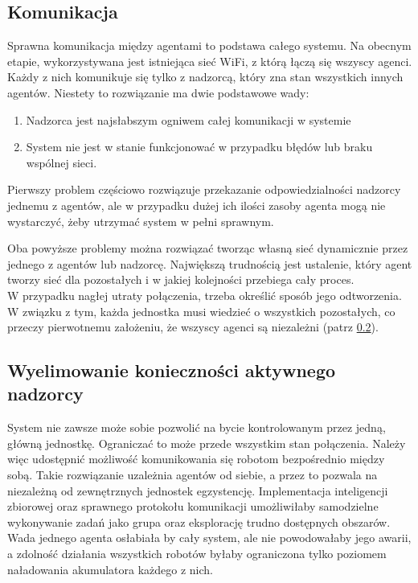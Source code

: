 \subsection{Komunikacja}

Sprawna komunikacja między agentami to podstawa całego systemu. Na obecnym etapie, wykorzystywana jest istniejąca sieć WiFi, z którą łączą się wszyscy agenci. Każdy z nich komunikuje się tylko z nadzorcą, który zna stan wszystkich innych agentów. Niestety to rozwiązanie ma dwie podstawowe wady:

\begin{enumerate}
    \item Nadzorca jest najsłabszym ogniwem całej komunikacji w systemie
    \item System nie jest w stanie funkcjonować w przypadku błędów lub braku wspólnej sieci.
\end{enumerate}

Pierwszy problem częściowo rozwiązuje przekazanie odpowiedzialności nadzorcy jednemu z agentów, ale w przypadku dużej ich ilości zasoby agenta mogą nie wystarczyć, żeby utrzymać system w pełni sprawnym.

Oba powyższe problemy można rozwiązać tworząc własną sieć dynamicznie przez jednego z agentów lub nadzorcę. Największą trudnością jest ustalenie, który agent tworzy sieć dla pozostałych i w jakiej kolejności przebiega cały proces.\\W przypadku nagłej utraty połączenia, trzeba określić sposób jego odtworzenia.\\W związku z tym, każda jednostka musi wiedzieć o wszystkich pozostałych, co przeczy pierwotnemu założeniu, że wszyscy agenci są niezależni (patrz \ref{sub:no_master}).

\subsection{Wyelimowanie konieczności aktywnego nadzorcy}
\label{sub:no_master}

System nie zawsze może sobie pozwolić na bycie kontrolowanym przez jedną, główną jednostkę. Ograniczać to może przede wszystkim stan połączenia. Należy więc udostępnić możliwość komunikowania się robotom bezpośrednio między sobą. Takie rozwiązanie uzależnia agentów od siebie, a przez to pozwala na niezależną od zewnętrznych jednostek egzystencję. Implementacja inteligencji zbiorowej oraz sprawnego protokołu komunikacji umożliwiłaby samodzielne wykonywanie zadań jako grupa oraz eksplorację trudno dostępnych obszarów. Wada jednego agenta osłabiała by cały system, ale nie powodowałaby jego awarii, a zdolność działania wszystkich robotów byłaby ograniczona tylko poziomem naładowania akumulatora każdego z nich.
